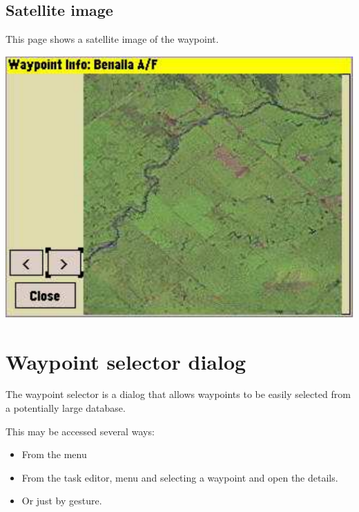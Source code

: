\subsection*{Satellite image}
This page shows a satellite image of the
waypoint.


\begin{center}
\includegraphics[angle=0,width=0.8\linewidth,keepaspectratio='true']{figures/dialog-waypointdetails2.pdf}
\end{center}


\section{Waypoint selector dialog}\label{sec:waypoint-selector-dialog}
The waypoint selector is a dialog that allows waypoints to be easily selected
from a potentially large database.

This may be accessed several ways:
\begin{itemize}
\item  From the menu \blink{}
\item  From the task editor, menu \blink{} and selecting a waypoint and open the details.
\item  Or just by gesture.
\end{itemize}

